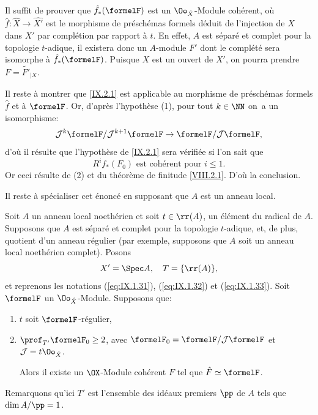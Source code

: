 Il suffit de prouver que $\hat{f}_*(\formelF)$ est un $\Oo_{\hat{X}}$-Module coh\'erent, o\`u $\hat{f}: \hat{X} \to \hat{X'}$ est le morphisme de pr\'esch\'emas formels d\'eduit de l'injection de $X$ dans $X'$ par compl\'etion par rapport \`a $t$. En effet, $A$ est s\'epar\'e et complet pour la topologie $t$-adique, il existera donc un $A$-module $F'$ dont le compl\'et\'e sera isomorphe \`a $\hat{f}_*(\formelF)$. Puisque $X$ est un ouvert de $X'$, on pourra prendre $F=\tilde{F'}_{|X}$.

Il reste \`a montrer que \ref{IX.2.1} est applicable au morphisme de pr\'esch\'emas formels $\hat{f}$ et \`a $\formelF$. Or, d'apr\`es l'hypoth\`ese (1), pour tout $k\in \NN$ on~a un isomorphisme:
\begin{equation*} {\Jb}^k \formelF /{\Jb}^{k+1}\formelF \to \formelF / {\Jb} \formelF,
\end{equation*}
d'o\`u il r\'esulte que l'hypoth\`ese de \ref{IX.2.1} sera v\'erifi\'ee si l'on sait que
\[
R^if_*(F_0)\text{ est cohérent pour }i \leq 1.
\]
Or ceci r\'esulte de (2) et du th\'eor\`eme de finitude \ref{VIII.2.1}. D'o\`u la conclusion.

Il reste \`a sp\'ecialiser cet \'enonc\'e en supposant que $A$ est un anneau local.

\begin{corollaire}\setcounter{equation}{8} \label{IX.2.3}
Soit $A$ un anneau local noeth\'erien et soit $t \in \rr(A)$, un \'el\'ement du radical de $A$. Supposons que $A$ est s\'epar\'e et complet pour la topologie $t$-adique, et, de plus, quotient d'un anneau r\'egulier (par exemple, supposons que $A$ soit un anneau local noeth\'erien complet). Posons
\begin{equation} \label{eq:IX.2.9} X'=\Spec A, \quad T = \{ \rr(A) \},
\end{equation}
et reprenons les notations (\ref{eq:IX.1.31}), (\ref{eq:IX.1.32}) et (\ref{eq:IX.1.33}). Soit $\formelF$ un $\Oo_{\hat{X}}$-Module. Supposons que:
\begin{enumerate}
\item
$t$ soit $\formelF$-r\'egulier,
\item
$\prof_{T'} \formelF_0 \geq 2$, avec $\formelF_0=\formelF/{\Jb}\formelF$ et ${\Jb}=t\Oo_{\hat{X}}$.

Alors il existe un $\OX$-Module coh\'erent $F$ tel que $\hat{F}\simeq \formelF$.
\end{enumerate}
\end{corollaire}

Remarquons qu'ici $T'$ est l'ensemble des id\'eaux premiers $\pp$ de $A$ tels que \hbox{$\dim A/\pp =1$}.


